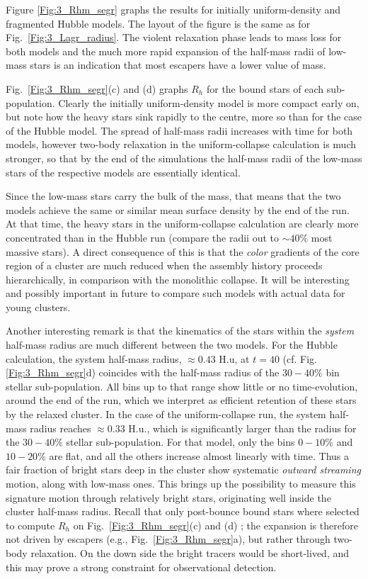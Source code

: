 Figure \ref{Fig:3_Rhm_segr} graphs the results for initially uniform-density and fragmented Hubble models. The layout of the figure is the same as for Fig.~\ref{Fig:3_Lagr_radius}. The violent relaxation phase leads to mass loss for both models and the much more rapid expansion of the half-mass radii of low-mass stars is an indication that most escapers have a lower value of mass.

 Fig.~\ref{Fig:3_Rhm_segr}(c) and (d) graphs $R_h$ for the bound stars of each sub-population. Clearly the initially uniform-density model is more compact early on, but note how the heavy stars sink rapidly to the centre, more so than for the case of the Hubble model. The spread of half-mass radii increases with time for both models, however two-body relaxation in the uniform-collapse calculation is much stronger, so that by the end of the simulations the half-mass radii of the low-mass stars of the respective models are essentially identical. 
 
 Since the low-mass stars carry the bulk of the mass, that means that the two models achieve the same or similar mean surface density by the end of the run. At that time, the heavy stars in the uniform-collapse calculation are clearly more concentrated than in the Hubble run (compare the radii out to $\sim 40\%$ most massive stars). A direct consequence of this is that the {\it color} gradients of the core region of a cluster are much reduced when the assembly history proceeds hierarchically, in comparison with the monolithic collapse. It will be interesting and possibly important in future to compare such models with actual data for young clusters.

Another interesting remark is that the kinematics of the stars within the {\it system} half-mass radius are much different between the two models. For the Hubble calculation, the system half-mass radius, $ \approx 0.43 $ H.u, at $t = 40$ (cf. Fig.\ref{Fig:3_Rhm_segr}d) coincides with the half-mass radius of the $30-40\%$ bin stellar sub-population. All bins up to that range show little or no time-evolution, around the end of the run, which we interpret as efficient retention of these stars by the relaxed cluster. In the case of the uniform-collapse run, the system half-mass radius reaches $\approx 0.33$ H.u., which is significantly larger than the radius for the $30-40\%$ stellar sub-population. For that model, only the bins $0-10\%$ and $10-20\%$ are flat, and all the others increase almost linearly with time. Thus a fair fraction of bright stars deep in the cluster show systematic {\it outward streaming} motion, along with low-mass ones. This brings up the possibility to measure this signature motion through relatively bright stars, originating well inside the cluster half-mass radius. Recall that only post-bounce bound stars where selected to compute $R_h$ on Fig.~\ref{Fig:3_Rhm_segr}(c) and (d) ; the expansion is therefore not driven by escapers (e.g., Fig.~\ref{Fig:3_Rhm_segr}a), but rather through two-body relaxation. On the down side the bright tracers would be short-lived, and this may prove a strong constraint for observational detection.


